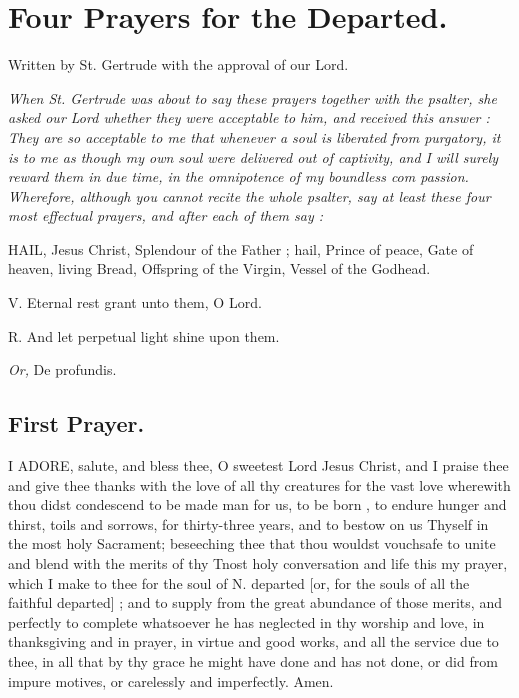 \documentclass[a5paper,12pt]{memoir}
\begin{document}
\section{Four Prayers for the Departed.} 

Written by St. Gertrude with the approval 
of our Lord. 

\emph{When St. Gertrude 
was about to say these 
prayers together with the 
psalter, she asked our 
Lord whether they were 
acceptable to him, and 
received this answer : 
They are so acceptable 
to me that whenever a 
soul is liberated from 
purgatory, it is to me as 
though my own soul 
were delivered out of 
captivity, and I will 
surely reward them in 
due time, in the omnipotence of my boundless com passion. Wherefore, although you cannot recite the whole psalter, say at least these 
four most effectual prayers, and after each of 
them say :} 

HAIL, Jesus Christ, 
Splendour of the 
Father ; hail, Prince of 
peace, Gate of heaven, 
living Bread, Offspring 
of the Virgin, Vessel 
of the Godhead. 

V. Eternal rest 
grant unto them, O 
Lord. 

R. And let perpetual light shine upon 
them. 

\emph{Or,} De profundis. 

\subsection{First Prayer.} 

I ADORE, salute, and 
bless thee, O sweetest Lord Jesus Christ, 
and I praise thee and 
give thee thanks with 
the love of all thy creatures for the vast love 
wherewith thou didst 
condescend to be made 
man for us, to be born , 
to endure hunger and 
thirst, toils and sorrows, for thirty-three 
years, and to bestow 
on us Thyself in the 
most holy Sacrament; 
beseeching thee that 
thou wouldst vouchsafe to unite and blend 
with the merits of thy 
Tnost holy conversation and life this my 
prayer, which I make 
to thee for the soul of 
N. departed [or, for 
the souls of all the 
faithful departed] ; 
and to supply from 
the great abundance 
of those merits, and 
perfectly to complete 
whatsoever he has neglected in thy worship 
and love, in thanksgiving and in prayer, 
in virtue and good 
works, and all the service due to thee, in all 
that by thy grace he 
might have done and 
has not done, or did 
from impure motives, 
or carelessly and imperfectly. Amen. 
\end{document}
